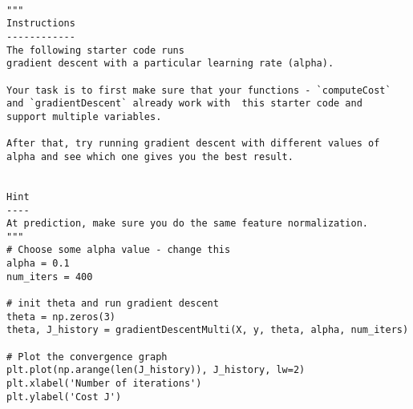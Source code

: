 \documentclass[11pt]{article}
\begin{document}
\begin{verbatim}

"""
Instructions
------------
The following starter code runs
gradient descent with a particular learning rate (alpha).

Your task is to first make sure that your functions - `computeCost`
and `gradientDescent` already work with  this starter code and
support multiple variables.

After that, try running gradient descent with different values of
alpha and see which one gives you the best result.


Hint
----
At prediction, make sure you do the same feature normalization.
"""
# Choose some alpha value - change this
alpha = 0.1
num_iters = 400

# init theta and run gradient descent
theta = np.zeros(3)
theta, J_history = gradientDescentMulti(X, y, theta, alpha, num_iters)

# Plot the convergence graph
plt.plot(np.arange(len(J_history)), J_history, lw=2)
plt.xlabel('Number of iterations')
plt.ylabel('Cost J')
\end{verbatim}
\end{document}
